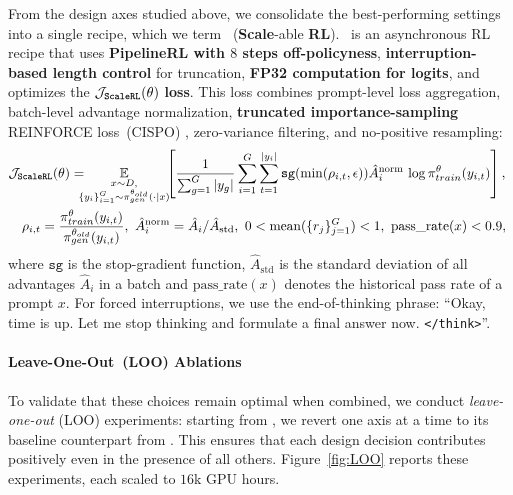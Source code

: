 From the design axes studied above, we consolidate the best-performing settings into a single recipe, which we term \scalerl\ (\textbf{Scale}-able \textbf{RL}). 
\scalerl\ is an asynchronous RL recipe that uses \textbf{PipelineRL with $8$ steps off-policyness}, \textbf{interruption-based length control} for truncation, \textbf{FP32 computation for logits}, and optimizes the $\mathbf{\mathcal{J}_{\mathrm{\texttt{\textbf{ScaleRL}}}}(\theta)}$ \textbf{loss}. This loss combines prompt-level loss aggregation, batch-level advantage normalization, \textbf{truncated importance-sampling} REINFORCE loss~(CISPO) , zero-variance filtering, and no-positive resampling: 
\begin{align*}
& \mathcal{J}_{\mathrm{\scalerl}}(\theta) 
=\hspace{-0.7em} \underset{\substack{x \sim D, \\ \{y_i\}_{i=1}^G \sim \pi_{gen}^{\theta_{old}}(\cdot \mid x)}}{\mathbb{E}}
\hspace{-0.4em}
\left[ \frac{1}{\sum_{g=1}^{G} |y_g|} \sum_{i=1}^G \sum_{t=1}^{|y_i|} \texttt{sg}(\mathrm{min}(\rho_{i, t}, \epsilon)) \hat{A}_{i}^{\text{norm}} \, \log\pi_{train}^\theta(y_{i,t})\right], \\
& \quad  \rho_{i, t}=\frac{\pi_{train}^\theta(y_{i,t})}{\pi_{gen}^{\theta_{old}}(y_{i,t})},\ \hat{A}^{\mathrm{norm}}_{i}
= \hat{A}_{i}/\hat{A}_{\text{std}},\ 0 <  \mathrm{mean}(\{r_j\}_{j=1}^G) < 1,\  \text{pass\_rate}(x) < 0.9,\ 
\end{align*}
where $\texttt{sg}$ is the stop-gradient function, $\hat{A}_{\text{std}}$ is the standard deviation of all advantages $\hat{A}_{i}$ in a batch and $\text{pass\_rate}(x)$ denotes the historical pass rate of a prompt $x$.  For forced interruptions, we use the end-of-thinking phrase: ``Okay, time is up. Let me stop thinking and formulate a final answer now. \texttt{</think>}''.


\paragraph{Leave-One-Out~(LOO) Ablations}
To validate that these choices remain optimal when combined, we conduct \emph{leave-one-out} (LOO) experiments: starting from \scalerl, we revert one axis at a time to its baseline counterpart from . 
This ensures that each design decision contributes positively even in the presence of all others. Figure~\ref{fig:LOO} reports these experiments, each scaled to $16$k GPU hours.

